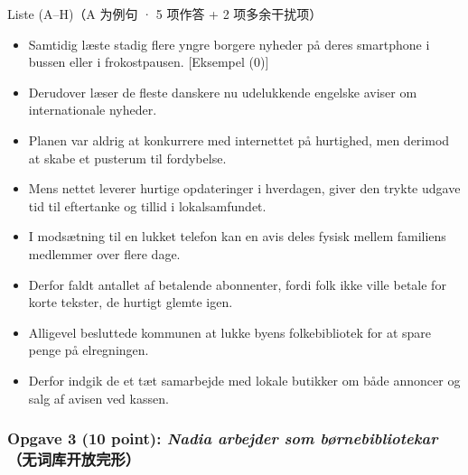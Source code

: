 \begin{grammatikbox}{Liste (A--H)（A 为例句 · 5 项作答 + 2 项多余干扰项）}
\small
\begin{itemize}[leftmargin=2.2em, itemsep=0.35em]
  \item[\textbf{\color{NCDGray}A.}] \textcolor{NCDGray}{Samtidig læste stadig flere yngre borgere nyheder på deres smartphone i bussen eller i frokostpausen.} {\footnotesize\color{NCDRed}[Eksempel (0)]}
  \item[\textbf{B.}] Derudover læser de fleste danskere nu udelukkende engelske aviser om internationale nyheder.
  \item[\textbf{C.}] Planen var aldrig at konkurrere med internettet på hurtighed, men derimod at skabe et pusterum til fordybelse.
  \item[\textbf{D.}] Mens nettet leverer hurtige opdateringer i hverdagen, giver den trykte udgave tid til eftertanke og tillid i lokalsamfundet.
  \item[\textbf{E.}] I modsætning til en lukket telefon kan en avis deles fysisk mellem familiens medlemmer over flere dage.
  \item[\textbf{F.}] Derfor faldt antallet af betalende abonnenter, fordi folk ikke ville betale for korte tekster, de hurtigt glemte igen.
  \item[\textbf{G.}] Alligevel besluttede kommunen at lukke byens folkebibliotek for at spare penge på elregningen.
  \item[\textbf{H.}] Derfor indgik de et tæt samarbejde med lokale butikker om både annoncer og salg af avisen ved kassen.
\end{itemize}
\end{grammatikbox}

\subsubsection*{Opgave 3 (10 point): \textit{Nadia arbejder som børnebibliotekar}（无词库开放完形）}

